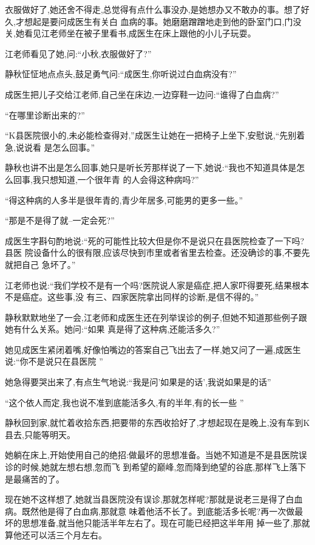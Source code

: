 ﻿\documentclass[12pt]{article}
\begin{document}
衣服做好了,她还舍不得走,总觉得有点什么事没办,是她想办又不敢办的事。想了好久,才想起是要问成医生有关白
血病的事。她磨磨蹭蹭地走到他的卧室门口,门没关,她看见江老师坐在被子里看书,成医生在床上跟他的小儿子玩耍。

江老师看见了她,问:``小秋,衣服做好了?''

静秋怔怔地点点头,鼓足勇气问:``成医生,你听说过白血病没有?''

成医生把儿子交给江老师,自己坐在床边,一边穿鞋一边问:``谁得了白血病?''

``在哪里诊断出来的?''

``K县医院很小的,未必能\myrule 检查得\myrule 对,''成医生让她在一把椅子上坐下,安慰说,``先别着急,说说看
是怎么回事。''


静秋也讲不出是怎么回事,她只是听长芳那样说了一下,她说:``我也不知道具体是怎么回事,我只想知道,一个很年青
的人会得\myrule 这种病吗?''

``得\myrule 这种病的人多半是\myrule 很年青的\myrule ,青少年\myrule 居多,可能男的更多一些。''

``那\myrule 是不是得了\myrule 就--一定会\myrule 死?''

成医生字斟句酌地说:``死的\myrule 可能性比较大\myrule 但是\myrule 你不是说只在县医院检查了一下吗?县医
院设备什么的\myrule 很有限,应该尽快到\myrule 市里或者省里\myrule 去检查。还没确诊的事,不要先就把自己
急坏了。''

江老师也说:``我们学校不是有一个吗?医院说人家是癌症,把人家吓得要死,结果根本不是癌症\myrule 。这些事,没
有三、四家医院拿出同样的诊断,是信不得的。''

静秋默默地坐了一会,江老师和成医生还在列举误诊的例子,但她不知道那些例子跟她有什么关系。她问:``如果
\myrule 真是得了\myrule 这种病,还能活\myrule 多久?''

她见成医生紧闭着嘴,好像怕嘴边的答案自己飞出去了一样,她又问了一遍,成医生说:``你不是说只在县医院
\myrule ''

她急得要哭出来了,有点生气地说:``我是问'如果是的话',我说如果\myrule 是的话\myrule ''

``这个\myrule 依人而定,我\myrule 也说\myrule 不准到底能活多久,有的\myrule 半年,有的\myrule 长一些
\myrule ''


静秋回到家,就忙着收拾东西,把要带的东西收拾好了,才想起现在是晚上,没有车到K县去,只能等明天。

她躺在床上,开始使用自己的绝招:做最坏的思想准备。当她不知道是不是县医院误诊的时候,她就左想右想,忽而飞
到希望的巅峰,忽而降到绝望的谷底,那样飞上落下是最痛苦的了。

现在她不这样想了,她就当县医院没有误诊,那就怎样呢?那就是说老三是得了白血病。既然他是得了白血病,那就意
味着他活不长了。到底能活多长呢?再一次做最坏的思想准备,就当他只能活半年左右了。现在可能已经把这半年用
掉一些了,那就算他还可以活三个月左右。
\end{document}
